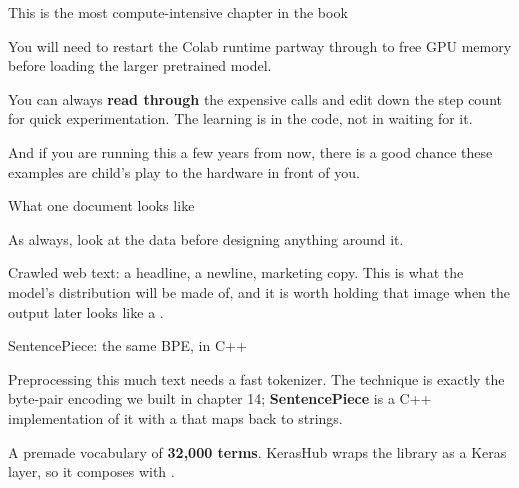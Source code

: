 \documentclass[aspectratio=169,11pt,t]{beamer}
\begin{document}
\begin{frame}[shrink=25]{This is the most compute-intensive chapter in the book}
\begin{minipage}[t]{0.3253\textwidth}
\end{minipage}%
\hfill
\begin{minipage}[t]{0.3253\textwidth}
\end{minipage}%
\hfill
\begin{minipage}[t]{0.3253\textwidth}
\end{minipage}%
{\fontsize{9.4}{12.6}\selectfont\color{fg2}You will need to restart the Colab runtime partway through to free GPU memory before loading the larger pretrained model.\par}\vskip 4pt
\begin{iband}[amber]
You can always \textbf{read through} the expensive  calls and edit down the step count for quick experimentation. The learning is in the code, not in waiting for it.
\end{iband}
{\fontsize{9.4}{12.6}\selectfont\color{fg2}And if you are running this a few years from now, there is a good chance these examples are child's play to the hardware in front of you.\par}\vskip 4pt
\end{frame}

\begin{frame}[shrink=25]{What one document looks like}
{\fontsize{9.4}{12.6}\selectfont\color{fg2}As always, look at the data before designing anything around it.\par}\vskip 4pt
{\fontsize{9.4}{12.6}\selectfont\color{fg2}Crawled web text: a headline, a newline, marketing copy. This is what the model's distribution will be made of, and it is worth holding that image when the output later looks like a .\par}\vskip 4pt
\end{frame}

\begin{frame}[shrink=25]{SentencePiece: the same BPE, in C++}
{\fontsize{9.4}{12.6}\selectfont\color{fg2}Preprocessing this much text needs a fast tokenizer. The technique is exactly the byte-pair encoding we built in chapter 14; \textbf{SentencePiece} is a C++ implementation of it with a  that maps back to strings.\par}\vskip 4pt
{\fontsize{9.4}{12.6}\selectfont\color{fg2}A premade vocabulary of \textbf{32,000 terms}. KerasHub wraps the library as a Keras layer, so it composes with .\par}\vskip 4pt
\end{frame}
\end{document}

